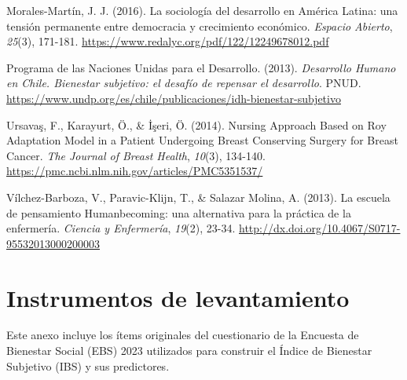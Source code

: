 \documentclass[
  spanish,
  a4paper,
  oneside]{scrbook}
\newlength{\cslhangindent}
\newenvironment{CSLReferences}[2] %
 {\begin{list}{}{%
  \setlength{\itemindent}{0pt}
  \setlength{\leftmargin}{0pt}
  \setlength{\parsep}{0pt}
  \ifodd #1
   \setlength{\leftmargin}{\cslhangindent}
   \setlength{\itemindent}{-1\cslhangindent}
  \fi
  \setlength{\itemsep}{#2\baselineskip}}}
 {\end{list}}
\begin{document}
\begin{CSLReferences}{1}{0}
Morales-Martín, J. J. (2016). La sociolog{í}a del desarrollo en
Am{é}rica Latina: una tensi{ó}n permanente entre democracia y
crecimiento econ{ó}mico. \emph{Espacio Abierto}, \emph{25}(3), 171-181.
\url{https://www.redalyc.org/pdf/122/12249678012.pdf}

Programa de las Naciones Unidas para el Desarrollo. (2013).
\emph{Desarrollo Humano en Chile. Bienestar subjetivo: el desaf{í}o de
repensar el desarrollo}. PNUD.
\url{https://www.undp.org/es/chile/publicaciones/idh-bienestar-subjetivo}

Ursavaş, F., Karayurt, Ö., \& İşeri, Ö. (2014). Nursing Approach Based
on Roy Adaptation Model in a Patient Undergoing Breast Conserving
Surgery for Breast Cancer. \emph{The Journal of Breast Health},
\emph{10}(3), 134-140.
\url{https://pmc.ncbi.nlm.nih.gov/articles/PMC5351537/}

Vílchez-Barboza, V., Paravic-Klijn, T., \& Salazar Molina, A. (2013). La
escuela de pensamiento Humanbecoming: una alternativa para la pr{á}ctica
de la enfermer{í}a. \emph{Ciencia y Enfermer{í}a}, \emph{19}(2), 23-34.
\url{http://dx.doi.org/10.4067/S0717-95532013000200003}

\end{CSLReferences}

\cleardoublepage
{}
{}
\appendix

\chapter{Instrumentos de
levantamiento}\label{instrumentos-de-levantamiento}

Este anexo incluye los ítems originales del cuestionario de la Encuesta
de Bienestar Social (EBS) 2023 utilizados para construir el Índice de
Bienestar Subjetivo (IBS) y sus predictores.
\end{document}

